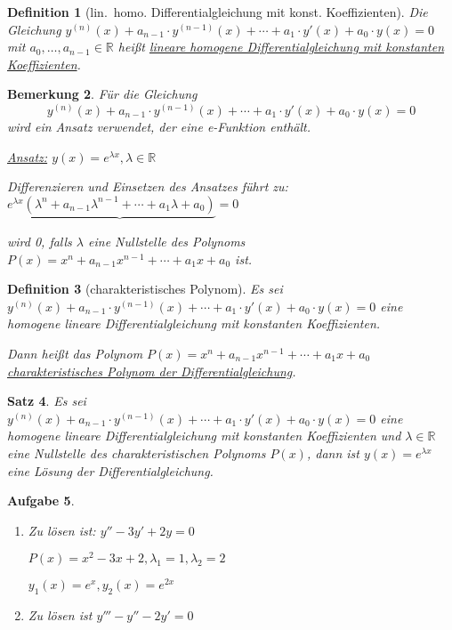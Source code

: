 \documentclass[fontset=ubuntu,12pt,a4paper]{scrreprt}
\newtheorem{defi}{Definition}[section]
\newtheorem{bemerkung}[defi]{Bemerkung}
\newtheorem{satz}[defi]{Satz}
\newtheorem{aufg}[defi]{Aufgabe}
\begin{document}
    \begin{defi}[lin.\ homo. Differentialgleichung mit konst. Koeffizienten]
        Die Gleichung \(y^{(n)}(x) + a_{n-1} \cdot y^{(n-1)}(x) + \cdots + a_1 \cdot y'(x) + a_0 \cdot y(x) = 0\) mit \(a_0,\dots,a_{n-1} \in \mathbb{R}\) heißt \underline{lineare homogene Differentialgleichung mit konstanten Koeffizienten}.
    \end{defi}

    \begin{bemerkung}
        Für die Gleichung
        \[y^{(n)}(x) + a_{n-1} \cdot y^{(n-1)}(x) + \cdots + a_1 \cdot y'(x) + a_0 \cdot y(x) = 0\]
        wird ein Ansatz verwendet, der eine e-Funktion enthält.

        \underline{Ansatz:} \(y(x)=e^{\lambda x},\lambda\in\mathbb{R}\)

        Differenzieren und Einsetzen des Ansatzes führt zu: \\ \(e^{\lambda x}\underbrace{(\lambda^n+a_{n-1}\lambda^{n-1}+\cdots+a_1\lambda+a_0)}=0\)
        
        wird 0, falls \(\lambda\) eine Nullstelle des Polynoms \(P(x)=x^n+a_{n-1}x^{n-1}+\cdots+a_1x+a_0\) ist.
    \end{bemerkung}

    \begin{defi}[charakteristisches Polynom]
        Es sei \(y^{(n)}(x) + a_{n-1} \cdot y^{(n-1)}(x) + \cdots + a_1 \cdot y'(x) + a_0 \cdot y(x) = 0\) eine homogene lineare Differentialgleichung mit konstanten Koeffizienten.

        Dann heißt das Polynom \(P(x)=x^n+a_{n-1}x^{n-1}+\cdots+a_1x+a_0\) \\ \underline{charakteristisches Polynom der Differentialgleichung}.
    \end{defi}

    \begin{satz}
        Es sei \(y^{(n)}(x) + a_{n-1} \cdot y^{(n-1)}(x) + \cdots + a_1 \cdot y'(x) + a_0 \cdot y(x) = 0\) eine homogene lineare Differentialgleichung mit konstanten Koeffizienten und \(\lambda \in\mathbb{R}\) eine Nullstelle des charakteristischen Polynoms \(P(x)\), dann ist \(y(x)=e^{\lambda x}\) eine Lösung der Differentialgleichung.
    \end{satz}

    \begin{aufg}
        \begin{enumerate}[label=\emph{(\roman*)}]
            \item Zu lösen ist: \(y''-3y'+2y=0\)
            
            \(P(x)=x^2-3x+2,\lambda_1=1,\lambda_2=2\)

            \(y_1(x)=e^x,y_2(x)=e^{2x}\)

            \item Zu lösen ist \(y'''-y''-2y'=0\)
         \end{enumerate}
    \end{aufg}
\end{document}
